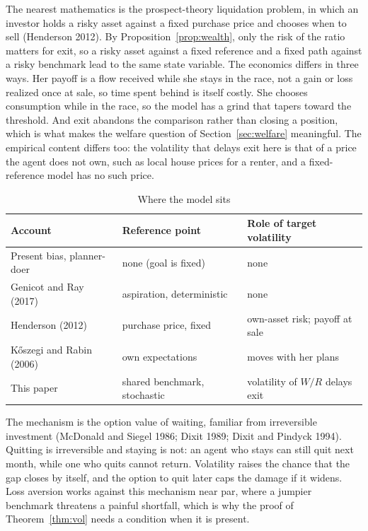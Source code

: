\documentclass[12pt]{article}
\theoremstyle{definition}
\theoremstyle{remark}
\theoremstyle{plain}
\theoremstyle{definition}
\begin{document}
The nearest mathematics is the prospect-theory liquidation problem, in which an investor holds a risky asset against a fixed purchase price and chooses when to sell (Henderson 2012). By Proposition~\ref{prop:wealth}, only the risk of the ratio matters for exit, so a risky asset against a fixed reference and a fixed path against a risky benchmark lead to the same state variable. The economics differs in three ways. Her payoff is a flow received while she stays in the race, not a gain or loss realized once at sale, so time spent behind is itself costly. She chooses consumption while in the race, so the model has a grind that tapers toward the threshold. And exit abandons the comparison rather than closing a position, which is what makes the welfare question of Section~\ref{sec:welfare} meaningful. The empirical content differs too: the volatility that delays exit here is that of a price the agent does not own, such as local house prices for a renter, and a fixed-reference model has no such price.

\begin{table}[t]
\centering\small
\caption{Where the model sits}\label{tab:compare}
\begin{tabular}{@{}lll@{}}
\toprule
Account & Reference point & Role of target volatility \\
\midrule
Present bias, planner-doer & none (goal is fixed) & none \\
Genicot and Ray (2017) & aspiration, deterministic & none \\
Henderson (2012) & purchase price, fixed & own-asset risk; payoff at sale \\
K\H{o}szegi and Rabin (2006) & own expectations & moves with her plans \\
This paper & shared benchmark, stochastic & volatility of $W/R$ delays exit \\
\bottomrule
\end{tabular}
\end{table}

The mechanism is the option value of waiting, familiar from irreversible investment (McDonald and Siegel 1986; Dixit 1989; Dixit and Pindyck 1994). Quitting is irreversible and staying is not: an agent who stays can still quit next month, while one who quits cannot return. Volatility raises the chance that the gap closes by itself, and the option to quit later caps the damage if it widens. Loss aversion works against this mechanism near par, where a jumpier benchmark threatens a painful shortfall, which is why the proof of Theorem~\ref{thm:vol} needs a condition when it is present.
\end{document}
